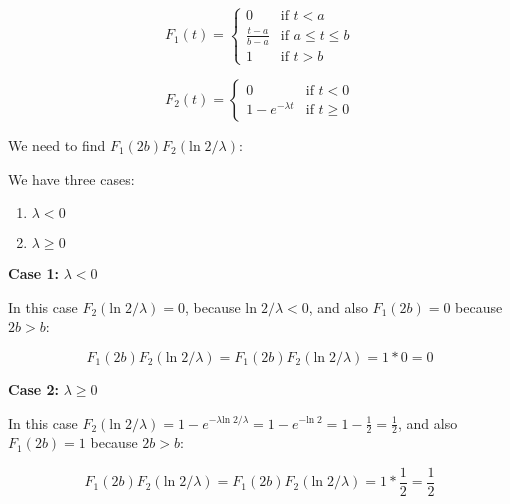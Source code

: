 \begin{equation}
    F_1(t) = \begin{cases}
        0                 & \text{if } t < a           \\
        \frac{t - a}{b-a} & \text{if } a \leq t \leq b \\
        1                 & \text{if } t > b
    \end{cases}
\end{equation}

\singlespacing

\begin{equation}
    F_2(t) = \begin{cases}
        0                  & \text{if } t < 0    \\
        1 - e^{-\lambda t} & \text{if } t \geq 0
    \end{cases}
\end{equation}

\singlespacing

We need to find $F_1(2b)F_2(\text{ln}\; 2/\lambda)$:

\singlespacing

We have three cases:

\singlespacing

\begin{enumerate}
    \item $\lambda < 0$
    \item $\lambda \geq 0$
\end{enumerate}

\singlespacing

\textbf{Case 1:} $\lambda < 0$

\singlespacing

In this case $F_2(\text{ln}\; 2/\lambda) = 0$, because $\text{ln}\; 2/\lambda < 0$,
and also $F_1(2b) = 0$ because $2b > b$:

\singlespacing

\begin{equation}
    F_1(2b)F_2(\text{ln}\; 2/\lambda) = F_1(2b)F_2(\text{ln}\; 2/\lambda) = 1 * 0 = 0
\end{equation}

\singlespacing

\textbf{Case 2:} $\lambda \geq 0$

\singlespacing

In this case $F_2(\text{ln}\; 2/\lambda) = 1 - e^{-\lambda \text{ln}\; 2/\lambda} = 1 - e^{-\text{ln}\; 2} = 1 - \frac{1}{2} = \frac{1}{2}$,
and also $F_1(2b) = 1$ because $2b > b$:

\singlespacing

\begin{equation}
    F_1(2b)F_2(\text{ln}\; 2/\lambda) = F_1(2b)F_2(\text{ln}\; 2/\lambda) = 1 * \frac{1}{2} = \frac{1}{2}
\end{equation}